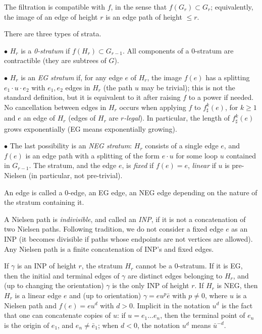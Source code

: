 \documentclass[11pt]{amsart}
\theoremstyle{remark}
\newcommand{\inc}{\subset}
\begin{document}
 The filtration is compatible with $f$, in the sense that   $f(G_r)\inc G_r$; equivalently,   the image of an edge of height $r$ is an edge path   of height $\le r$.
 
 There are three types of strata. 
 
$\bullet$  $H_r$ is a \emph{0-stratum} if $f(H_r)\inc G_{r-1}$.  All components of a  0-stratum are contractible (they are subtrees of $G$). 
 
$\bullet$  
$H_r$  is an \emph{EG stratum} if, for any edge $e$ of $H_r$, the image $f(e)$ has a splitting $e_1\cdot u \cdot e_2$ with $e_1,e_2$ edges in $H_r$ (the path $u$ may be   trivial); this is not the standard definition, but it is equivalent to it after raising $f$ to a power if needed. No cancellation between edges in $H_r$ occurs when applying $f$ to $f^k_\sharp(e)$, for $k\ge1$ and $e$ an edge of $H_r$ (edges of $H_r$ are  \emph{$r$-legal}).
In particular, the length of $f^k_\sharp(e)$ grows exponentially (EG means exponentially growing). 
 
$\bullet$ The last possibility is 
 an \emph{NEG stratum}: $H_r$ consists of a single edge $e$,    and $f(e)$ is an edge path with a splitting of the form $e\cdot u$ for some 
  loop $u$ contained in $G_{r-1}$. The stratum, and the edge $e$, is \emph{fixed} if $f(e)=e$, \emph{linear} if $u$ is pre-Nielsen   (in particular, not pre-trivial).   
  
An edge is called a 0-edge, an EG edge, an NEG edge depending on the nature of the stratum containing it.  
 
 
A Nielsen path is \emph{indivisible},  and called an \emph{INP}, if it is not a concatenation of two Nielsen paths. Following tradition,   we do not consider a fixed  edge $e$   as an INP (it becomes divisible if paths whose endpoints are not vertices are allowed). Any Nielsen path is a finite concatenation of INP's and fixed edges. 

If $\gamma$ is an INP of height $r$, the stratum $H_r$ cannot be a 0-stratum. If it is EG, then the initial and terminal edges of $\gamma$ are distinct edges belonging to $H_r$, and (up to changing the orientation) $\gamma$ is the only INP of height $r$.  If $H_r$ is NEG, then   $H_r$  is a linear edge $e$ and  (up to orientation) $\gamma=eu^p\bar e$ with $p\ne0$, where $u$ is a Nielsen path  and $f(e)=eu^d$ with $d>0$. Implicit in the notation $u^d$ is the fact that one can concatenate copies of $u$:    if $u=e_1\dots e_n$, then the terminal point of   $e_n$ is the origin of $e_1$, and  $e_n\ne\bar e_1$; when $d<0$, the notation $u^{d}$   means $\bar u^{-d}$. 
\end{document}
